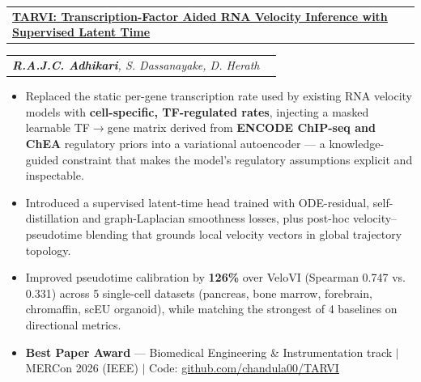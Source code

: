 \documentclass[a4paper,10pt]{article}
\makeatletter
\newcommand{\resumeItem}[1]{
  \item\small{
    {#1 \vspace{-2pt}}
  }
}
\newcommand{\resumeExperienceSubheading}[2]{
    \vspace{-19pt}\item
    \begin{tabularx}{\textwidth}{@{}>{\hsize=1.4\hsize}X>{\hsize=0.6\hsize}X@{}}
      \small#1 & \small #2 \\
    \end{tabularx}\vspace{-7pt}
}
\newcommand{\resumeProjectHeading}[2]{
    \item
    \begin{tabular*}{0.97\textwidth}{l@{\extracolsep{\fill}}r}
      #1 & \footnotesize #2 \\
    \end{tabular*}\vspace{-7pt}
}
\newcommand{\resumeItemListStart}{\begin{itemize}}
\newcommand{\resumeItemListEnd}{\end{itemize}\vspace{-5pt}}
\makeatother
\begin{document}
        \resumeProjectHeading
            {\textbf{\href{https://chandula00.github.io/TARVI/}
            {\underline{TARVI: Transcription-Factor Aided RNA Velocity Inference with Supervised Latent Time}}}}{}
            \vspace{-2pt}
            \resumeExperienceSubheading
                {\emph{\textbf{R.A.J.C. Adhikari}, S. Dassanayake, D. Herath}}{}
            \vspace{-12pt}
            \resumeItemListStart
            \resumeItem{Replaced the static per-gene transcription rate used by existing RNA velocity models with \textbf{cell-specific, TF-regulated rates}, injecting a masked learnable TF$\rightarrow$gene matrix derived from \textbf{ENCODE ChIP-seq and ChEA} regulatory priors into a variational autoencoder --- a knowledge-guided constraint that makes the model's regulatory assumptions explicit and inspectable.}
            \resumeItem{Introduced a supervised latent-time head trained with ODE-residual, self-distillation and graph-Laplacian smoothness losses, plus post-hoc velocity--pseudotime blending that grounds local velocity vectors in global trajectory topology.}
            \resumeItem{Improved pseudotime calibration by \textbf{126\%} over VeloVI (Spearman 0.747 vs. 0.331) across 5 single-cell datasets (pancreas, bone marrow, forebrain, chromaffin, scEU organoid), while matching the strongest of 4 baselines on directional metrics.}
            \resumeItem{\textbf{Best Paper Award} --- Biomedical Engineering \& Instrumentation track $|$ MERCon 2026 (IEEE) $|$ Code: \href{https://github.com/chandula00/TARVI}{\underline{github.com/chandula00/TARVI}}}
          \resumeItemListEnd
\end{document}
